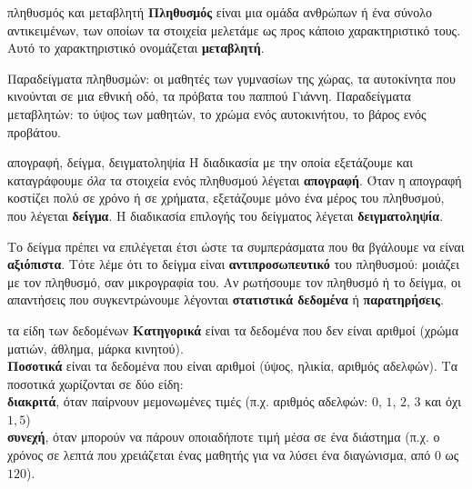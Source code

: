 
\begin{orismos}{πληθυσμός και μεταβλητή}
\textbf{Πληθυσμός} είναι μια ομάδα ανθρώπων ή ένα σύνολο αντικειμένων, των οποίων τα στοιχεία μελετάμε ως προς κάποιο χαρακτηριστικό τους. Αυτό το χαρακτηριστικό ονομάζεται \textbf{μεταβλητή}.
\end{orismos}

Παραδείγματα πληθυσμών: οι μαθητές των γυμνασίων της χώρας, τα αυτοκίνητα που κινούνται σε μια εθνική οδό, τα πρόβατα του παππού Γιάννη. Παραδείγματα μεταβλητών: το ύψος των μαθητών, το χρώμα ενός αυτοκινήτου, το βάρος ενός προβάτου.

\begin{orismos}{απογραφή, δείγμα, δειγματοληψία}
Η διαδικασία με την οποία εξετάζουμε και καταγράφουμε \emph{όλα} τα στοιχεία ενός πληθυσμού λέγεται \textbf{απογραφή}. Όταν η απογραφή κοστίζει πολύ σε χρόνο ή σε χρήματα, εξετάζουμε μόνο ένα μέρος του πληθυσμού, που λέγεται \textbf{δείγμα}. Η διαδικασία επιλογής του δείγματος λέγεται \textbf{δειγματοληψία}.
\end{orismos}

Το δείγμα πρέπει να επιλέγεται έτσι ώστε τα συμπεράσματα που θα βγάλουμε να είναι \textbf{αξιόπιστα}. Τότε λέμε ότι το δείγμα είναι \textbf{αντιπροσωπευτικό} του πληθυσμού: μοιάζει με τον πληθυσμό, σαν μικρογραφία του. Αν ρωτήσουμε τον πληθυσμό ή το δείγμα, οι απαντήσεις που συγκεντρώνουμε λέγονται \textbf{στατιστικά δεδομένα} ή \textbf{παρατηρήσεις}.

\begin{kanonas}{τα είδη των δεδομένων}
\textbf{Κατηγορικά} είναι τα δεδομένα που δεν είναι αριθμοί (χρώμα ματιών, άθλημα, μάρκα κινητού).\\
\textbf{Ποσοτικά} είναι τα δεδομένα που είναι αριθμοί (ύψος, ηλικία, αριθμός αδελφών). Τα ποσοτικά χωρίζονται σε δύο είδη:\\
\textbf{διακριτά}, όταν παίρνουν μεμονωμένες τιμές (π.χ. αριθμός αδελφών: $0$, $1$, $2$, $3$ και όχι $1{,}5$)\\
\textbf{συνεχή}, όταν μπορούν να πάρουν οποιαδήποτε τιμή μέσα σε ένα διάστημα (π.χ. ο χρόνος σε λεπτά που χρειάζεται ένας μαθητής για να λύσει ένα διαγώνισμα, από $0$ ως $120$).
\end{kanonas}

